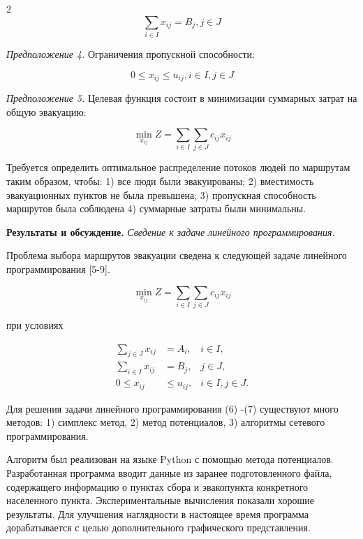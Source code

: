 \begin{multicols}{2}
\begin{equation}
\sum_{i \in I} x_{ij} = B_{j}, j \in J
\end{equation}

\emph{Предположение 4.} Ограничения пропускной способности:

\begin{equation}
0\leq x_{ij}\leq u_{ij}, i \in I, j \in J
\end{equation}

\emph{Предположение 5.} Целевая функция состоит в минимизации суммарных
затрат на общую эвакуацию:

\begin{equation}
\min_{x_{ij}} Z = \sum_{i \in I} \sum_{j \in J} c_{ij} x_{ij}
\end{equation}

Требуется определить оптимальное распределение потоков людей по
маршрутам таким образом, чтобы: 1) все люди были эвакуированы; 2)
вместимость эвакуационных пунктов не была превышена; 3) пропускная
способность маршрутов была соблюдена 4) суммарные затраты были
минимальны.

{\bfseries Результаты и обсуждение.} \emph{Сведение к задаче линейного
программирования.}

Проблема выбора маршрутов эвакуации сведена к следующей задаче линейного
программирования {[}5-9{]}.

\begin{equation}
\min_{x_{ij}} Z = \sum_{i \in I} \sum_{j \in J} c_{ij} x_{ij}
\end{equation}

при условиях

\begin{equation}
\begin{aligned}
\sum_{j \in J} x_{ij} &= A_{i}, & i \in I, \\
\sum_{i \in I} x_{ij} &= B_{j}, & j \in J, \\
0 \le x_{ij} &\le u_{ij}, & i \in I, j \in J.
\end{aligned}
\end{equation}

Для решения задачи линейного программирования (6) -(7) существуют много
методов: 1) симплекс метод, 2) метод потенциалов, 3) алгоритмы сетевого
программирования.

Алгоритм был реализован на языке Python с помощью метода потенциалов.
Разработанная программа вводит данные из заранее подготовленного файла,
содержащего информацию о пунктах сбора и эвакопункта конкретного
населенного пункта. Экспериментальные вычисления показали хорошие
результаты. Для улучшения наглядности в настоящее время программа
дорабатывается с целью дополнительного графического представления.


\end{multicols}
